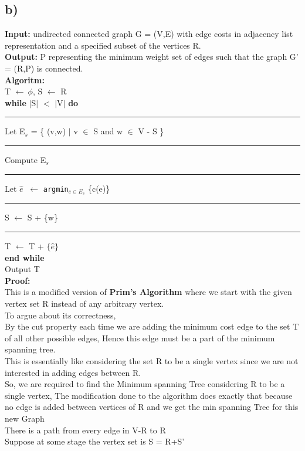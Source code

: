 \documentclass{report}
\begin{document}
 \subsection*{b)}
 \textbf{Input:} undirected connected graph G = (V,E) with edge costs in adjacency list representation and a specified subset of the vertices R.\\
 \textbf{Output:} P representing the minimum weight set of edges such that the graph G' = (R,P) is connected.\\
 \textbf{Algoritm:}\\
  T $\leftarrow \ \phi$, S $\leftarrow$ R \\
  \textbf{while} $|$S$|$ $<$ $|$V$|$ \textbf{do}\\
  \noindent\rule[0.5mm]{1cm}{0pt} Let E$_s$ = \{ (v,w) $\vert$ v $\in$ S and w $\in$ V - S \} \\
  \noindent\rule[0.5mm]{1cm}{0pt} Compute E$_s$\\
  \noindent\rule[0.5mm]{1cm}{0pt} Let $\hat{e}$ $\ \leftarrow $ \texttt{argmin}$_{e \in E_s}$ \{c(e)\}\\
  \noindent\rule[0.5mm]{1cm}{0pt} S $\leftarrow$ S + \{w\} \\
  \noindent\rule[0.5mm]{1cm}{0pt} T $\leftarrow$ T + $\{\hat{e}\}$ \\
  \textbf{end while}\\
  Output T
  \vspace*{0.25em}\\
  \textbf{Proof:}\\
  This is a modified version of \textbf{Prim's Algorithm} where we start with the given vertex set R instead of any arbitrary vertex.\\
  To argue about its correctness,\\ By the cut property each time we are adding the minimum cost edge to the set T of all other possible edges, Hence this edge must be a part of the minimum spanning tree.\\
  This is essentially like considering the set R to be a single vertex since we are not interested in adding edges between R.\\
  So, we are required to find the Minimum spanning Tree considering R to be a single vertex, The modification done to the algorithm does exactly that because no edge is added between vertices of R and we get the min spanning Tree for this new Graph\\
  There is a path from every edge in V-R to R\\
  Suppose at some stage the vertex set is S = R+S'\\
\end{document}
